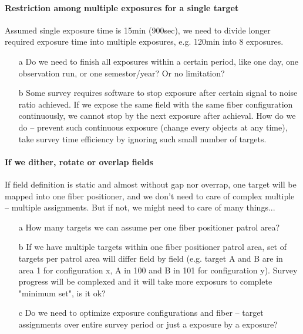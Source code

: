 \documentclass[a4paper,notitlepage]{article}
\newcommand{\cols}[1]{\textcolor{ccols}{#1}}
\newcommand{\colm}[1]{\textcolor{ccolm}{#1}}
\newcommand{\coll}[1]{\textcolor{ccoll}{#1}}
\begin{document}
\paragraph{Restriction among multiple exposures for a single target}

Assumed single exposure time is 15min (900sec), we need to divide longer 
required exposure time into multiple exposures, e.g. 120min into 8 exposures. 

\begin{enumerate}
  \item[\coll{a}] Do we need to finish all exposures within a certain period, like 
    one day, one observation run, or one semestor/year? Or no limitation? 
  \item[\colm{b}] Some survey requires software to stop exposure after certain 
    signal to noise ratio achieved. 
    If we expose the same field with the same fiber configuration
    continuously, we cannot stop by the next exposure after achieval. 
    How do we do -- prevent such continuous exposure (change every objects 
    at any time), take survey time efficiency by ignoring such small number of 
    targets.
\end{enumerate}


\paragraph{If we dither, rotate or overlap fields}

If field definition is static and almost without gap nor overrap, 
one target will be mapped into one fiber positioner, and we don't need to 
care of complex multiple -- multiple assignments. 
But if not, we might need to care of many things... 

\begin{enumerate}
  \item[\cols{a}] How many targets we can assume per one fiber positioner patrol 
    area?
  \item[b] If we have multiple targets within one fiber positioner patrol 
    area, set of targets per patrol area will differ field by field 
    (e.g. target A and B are in area 1 for configuration x, 
    A in 100 and B in 101 for configuration y). 
    Survey progress will be complexed and it will take more exposurs to 
    complete "minimum set", is it ok?
  \item[c] Do we need to optimize exposure configurations and fiber -- target 
    assignments over entire survey period or just a exposure by a exposure? 
\end{enumerate}
\end{document}
